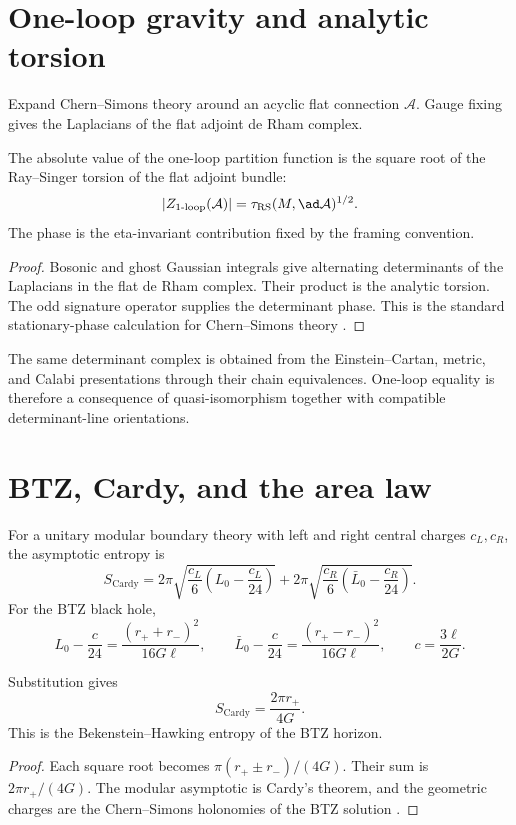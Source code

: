 \chapter{One-loop gravity and analytic torsion}
Expand Chern--Simons theory around an acyclic flat connection $\mathcal A$.  Gauge fixing gives the Laplacians of the flat adjoint de Rham complex.

\begin{theorem}
The absolute value of the one-loop partition function is the square root of the Ray--Singer torsion of the flat adjoint bundle:
\[
 |Z_{1\text{-loop}}(\mathcal A)|
 =\tau_{\mathrm{RS}}(M,\ad\mathcal A)^{1/2}.
\]
The phase is the eta-invariant contribution fixed by the framing convention.
\end{theorem}
\begin{proof}
Bosonic and ghost Gaussian integrals give alternating determinants of the Laplacians in the flat de Rham complex.  Their product is the analytic torsion.  The odd signature operator supplies the determinant phase.  This is the standard stationary-phase calculation for Chern--Simons theory \cite{RaySinger1971,Witten3DGravity}.
\end{proof}

The same determinant complex is obtained from the Einstein--Cartan, metric, and Calabi presentations through their chain equivalences.  One-loop equality is therefore a consequence of quasi-isomorphism together with compatible determinant-line orientations.

\chapter{BTZ, Cardy, and the area law}
For a unitary modular boundary theory with left and right central charges $c_L,c_R$, the asymptotic entropy is
\[
 S_{\mathrm{Cardy}}
 =2\pi\sqrt{\frac{c_L}{6}\left(L_0-\frac{c_L}{24}\right)}
 +2\pi\sqrt{\frac{c_R}{6}\left(\bar L_0-\frac{c_R}{24}\right)}.
\]
For the BTZ black hole,
\[
 L_0-\frac c{24}=\frac{(r_++r_-)^2}{16G\ell},
 \qquad
 \bar L_0-\frac c{24}=\frac{(r_+-r_-)^2}{16G\ell},
 \qquad
 c=\frac{3\ell}{2G}.
\]

\begin{theorem}
Substitution gives
\[
 S_{\mathrm{Cardy}}=\frac{2\pi r_+}{4G}.
\]
This is the Bekenstein--Hawking entropy of the BTZ horizon.
\end{theorem}
\begin{proof}
Each square root becomes $\pi(r_+\pm r_-)/(4G)$.  Their sum is $2\pi r_+/(4G)$.  The modular asymptotic is Cardy's theorem, and the geometric charges are the Chern--Simons holonomies of the BTZ solution \cite{Cardy1986,BTZ1992}.
\end{proof}

